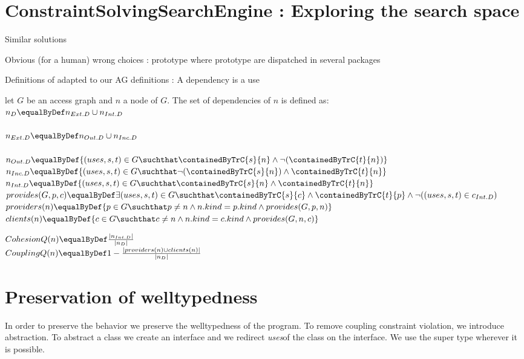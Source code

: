 \documentclass[]{article}
\newcommand{\textarc}[1]{\textit{#1}}
\newcommand{\textuses}{\textarc{uses}}
\begin{document}
\section{ConstraintSolvingSearchEngine : Exploring the search space}

Similar solutions

Obvious (for a human) wrong choices : prototype where prototype are dispatched in several packages 

Definitions of \cite{abdeen2009automatic} adapted to our AG definitions :
A dependency is a use

let $G$ be an access graph and $n$ a node of $G$.
The set of dependencies of $n$ is defined as:\\
$n_D \equalByDef n_{Ext.D}\cup n_{Int.D}$\\
\\
$n_{Ext.D} \equalByDef n_{Out.D}\cup n_{Inc.D}$\\
\\
$n_{Out.D} \equalByDef \{(uses, s, t)\in G \suchthat \containedByTrC{s}{n} \wedge \neg (\containedByTrC{t}{n}) \}$\\
$n_{Inc.D} \equalByDef \{(uses, s, t)\in G \suchthat \neg(\containedByTrC{s}{n}) \wedge \containedByTrC{t}{n} \}$\\
$n_{Int.D} \equalByDef \{(uses, s, t)\in G \suchthat \containedByTrC{s}{n} \wedge \containedByTrC{t}{n} \}$\\

\noindent$provides(G, p, c)\equalByDef \exists (uses, s, t) \in G \suchthat \containedByTrC{s}{c} \wedge \containedByTrC{t}{p} \wedge \neg((uses, s, t)\in c_{Int.D} )$\\
$providers(n) \equalByDef \{ p \in G  \suchthat p\neq n 
\wedge n.kind=p.kind 
\wedge provides(G, p, n) \}$\\
$clients(n) \equalByDef \{ c \in G  \suchthat c\neq n 
\wedge n.kind=c.kind 
\wedge provides(G, n, c) \}$

\noindent$CohesionQ(n) \equalByDef \frac{|n_{Int.D}|}{|n_D|}$\\
$CouplingQ(n) \equalByDef 1 - \frac{|providers(n) \cup clients(n)|}{|n_D|}$


\section{Preservation of welltypedness}

In order to preserve the behavior we preserve the welltypedness of the program. To remove coupling constraint violation, we introduce abstraction.
To abstract a class we create an interface and we redirect \textuses of the class on the interface. We use the super type wherever it is possible.
\end{document}
